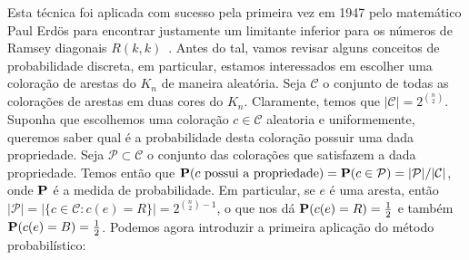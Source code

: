 Esta técnica foi aplicada com sucesso pela primeira vez em 1947 pelo matemático Paul Erdös para encontrar justamente um limitante inferior para os números de Ramsey diagonais $R(k,k)$~\cite{erdos47}. Antes do tal, vamos revisar alguns conceitos de probabilidade discreta, em particular, estamos interessados em escolher uma coloração de arestas do $K_n$ de maneira aleatória. Seja $\mathcal{C}$ o conjunto de todas as colorações de arestas em duas cores do $K_n$. Claramente, temos que $|\mathcal{C}| = 2^{\binom{n}{2}}$.
Suponha que escolhemos uma coloração $c \in \mathcal{C}$ aleatoria e uniformemente, queremos saber qual é a probabilidade desta coloração possuir uma dada propriedade. Seja $\mathcal{P} \subset \mathcal{C}$ o conjunto das colorações que satisfazem a dada propriedade. Temos então que $\operatorname{\mathbf{P}}(c \text{ possui a propriedade}) = \operatorname{\mathbf{P}}(c \in \mathcal{P}) = |\mathcal{P}| / |\mathcal{C}|$, onde $\operatorname{\mathbf{P}}$ é a medida de probabilidade.
Em particular, se $e$ é uma aresta, então $|\mathcal{P}| = |\{c \in \mathcal{C} : c(e) = R \}| = 2^{\binom{n}{2}-1}$, o que nos dá $\operatorname{\mathbf{P}}(c(e) = R) = \frac{1}{2}$ e também $\operatorname{\mathbf{P}}(c(e) = B) = \frac{1}{2}$. Podemos agora introduzir a primeira aplicação do método probabilístico:

